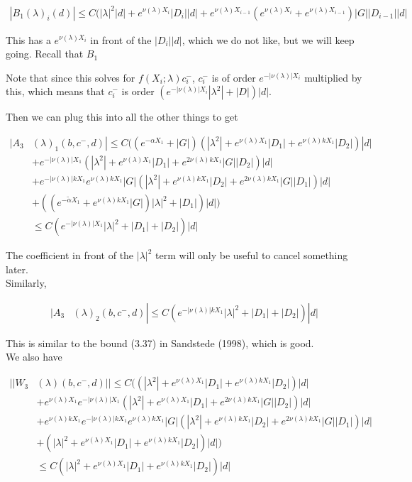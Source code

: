 \documentclass[12pt]{article}
\begin{document}
\begin{enumerate}
\begin{align}
|B_1(\lambda)_i(d)| \leq C(|\lambda|^2 |d| + e^{\nu(\lambda)X_i} |D_i||d|
+ e^{\nu(\lambda)X_{i-1}} (e^{\nu(\lambda)X_i} + e^{\nu(\lambda)X_{i-1}}) |G| |D_{i-1}||d|
\end{align}

This has a $e^{\nu(\lambda)X_i}$ in front of the $|D_i||d|$, which we do not like, but we will keep going. Recall that $B_1$

Note that since this solves for $f(X_i; \lambda) c_i^-$, $c_i^-$ is of order $e^{-|\nu(\lambda)|X_i}$ multiplied by this, which means that $c_i^-$ is order $(e^{-|\nu(\lambda)|X_i}|\lambda^2| + |D|)|d|$.

Then we can plug this into all the other things to get

\begin{align*}
|A_3&(\lambda)_1(b, c^-, d)| \leq C ((e^{-\alpha X_1} + |G|) (|\lambda^2| + e^{\nu(\lambda) X_1}|D_1| + e^{\nu(\lambda)k X_1}|D_2|)|d| \\
&+ e^{-|\nu(\lambda)| X_1}(|\lambda^2| + e^{\nu(\lambda) X_1}|D_1| + e^{2 \nu(\lambda)k X_1}|G||D_2|)|d| \\
&+ e^{-|\nu(\lambda)| k X_1} e^{\nu(\lambda)k X_1} |G| (|\lambda^2| + e^{\nu(\lambda)k X_1}|D_2| + e^{2 \nu(\lambda)k X_1}|G||D_1|)|d|\\
&+ ((e^{-\tilde{\alpha} X_1} + e^{\nu(\lambda)k X_1} |G|) |\lambda|^2 + |D_1| )|d| ) \\
&\leq C( e^{-|\nu(\lambda)|X_1} |\lambda|^2 + |D_1| + |D_2|) |d| 
\end{align*}

The coefficient in front of the $|\lambda|^2$ term will only be useful to cancel something later.\\

Similarly, 

\begin{align*}
|A_3&(\lambda)_2(b, c^-, d)| \leq C( e^{-|\nu(\lambda)| k X_1} |\lambda|^2 + |D_1| + |D_2|) |d|
\end{align*}

This is similar to the bound (3.37) in Sandstede (1998), which is good.\\

We also have

\begin{align*}
||W_3&(\lambda)(b,c^-,d)|| \leq C( (|\lambda^2| + e^{\nu(\lambda) X_1}|D_1| + e^{\nu(\lambda)k X_1}|D_2|)|d| \\
&+ e^{\nu(\lambda) X_1} e^{-|\nu(\lambda)| X_1}(|\lambda^2| + e^{\nu(\lambda) X_1}|D_1| + e^{2 \nu(\lambda)k X_1}|G||D_2|)|d| \\
&+ e^{\nu(\lambda) k X_1} e^{-|\nu(\lambda)| k X_1} e^{\nu(\lambda)k X_1} |G| (|\lambda^2| + e^{\nu(\lambda)k X_1}|D_2| + e^{2 \nu(\lambda)k X_1}|G||D_1|)|d|\\
&+ (|\lambda|^2 + e^{\nu(\lambda) X_1} |D_1| + e^{\nu(\lambda)k X_1}|D_2|) |d| )\\
&\leq C ( |\lambda|^2 + e^{\nu(\lambda) X_1} |D_1| + e^{\nu(\lambda)k X_1} |D_2| )|d|
\end{align*}


\end{enumerate}
\end{document}
